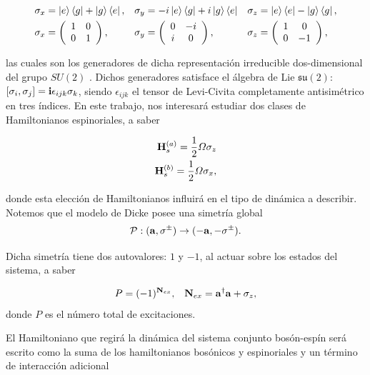 \documentclass{report} %
\numberwithin{equation}{section}
\begin{document}
\begin{align}
    \sigma_x &= \ket{e}\bra{g} + \ket{g}\bra{e}, & \sigma_y &= -i\ket{e}\bra{g} + i \ket{g}\bra{e} & \sigma_z &= \ket{e}\bra{e} - \ket{g}\bra{g}, \\
    \sigma_x & = \left( \begin{array}{cc}
       1 & 0 \\
       0 & 1
    \end{array} \right), & \sigma_y & = \left( \begin{array}{cc}
       0 & -i \\
       i & 0
    \end{array} \right), & \sigma_z & = \left( \begin{array}{cc}
       1 & 0 \\
       0 & -1
    \end{array} \right),
\end{align}

las cuales son los generadores de dicha representación irreducible dos-dimensional del grupo $SU(2)$ \cite{HoracioI}. Dichos generadores satisface el álgebra de Lie $\mathfrak{su(2)}$: $[\sigma_i,\sigma_j]={\bf i} \epsilon_{ijk}\sigma_k $, siendo $\epsilon_{ijk}$ el tensor de Levi-Civita completamente antisimétrico en tres índices. 
En este trabajo, nos interesará estudiar dos clases de Hamiltonianos espinoriales, a saber

\begin{align}
    {\bf H}_s^{(a)} = \frac{1}{2} \Omega \sigma_z \\
    {\bf H}_s^{(b)} = \frac{1}{2} \Omega \sigma_x,
\end{align}

donde esta elección de Hamiltonianos influirá en el tipo de dinámica a describir. Notemos que el modelo de Dicke posee una simetría global 
\begin{equation}
    \mathcal{P}: ({\bf a},\sigma^{\pm})\rightarrow (-{\bf a},-\sigma^{\pm}).
\end{equation}

Dicha simetría tiene dos autovalores: $1$ y $-1$, al actuar sobre los estados del sistema, a saber 

\begin{align}
    P & = (-1)^{{\bf N}_{ex}}, & {\bf N}_{ex} = {\bf a }^{\dagger}{\bf a} + \sigma_z,
\end{align}
donde $P$ es el número total de excitaciones. 

El Hamiltoniano que regirá la dinámica del sistema conjunto bosón-espín será escrito como la suma de los hamiltonianos bosónicos y espinoriales y un término de interacción adicional
\end{document}
